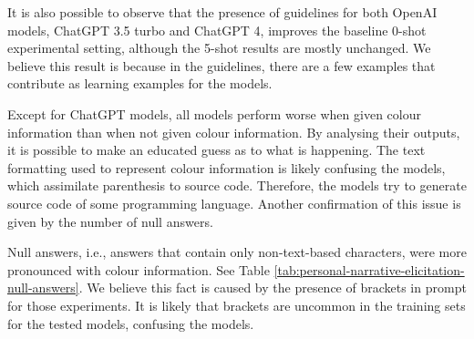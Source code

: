 It is also possible to observe that the presence of guidelines for both OpenAI models, ChatGPT 3.5 turbo and ChatGPT 4, improves the baseline 0-shot experimental setting, although the 5-shot results are mostly unchanged. We believe this result is because in the guidelines, there are a few examples that contribute as learning examples for the models.  

Except for ChatGPT models, all models perform worse when given colour information than when not given colour information. By analysing their outputs, it is possible to make an educated guess as to what is happening. The text formatting used to represent colour information is likely confusing the models, which assimilate parenthesis to source code. Therefore, the models try to generate source code of some programming language. Another confirmation of this issue is given by the number of null answers. 

Null answers, i.e., answers that contain only non-text-based characters, were more pronounced with colour information. See Table \ref{tab:personal-narrative-elicitation-null-answers}.
 We believe this fact is caused by the presence of brackets in prompt for those experiments. It is likely that brackets are uncommon in the training sets for the tested models, confusing the models.


